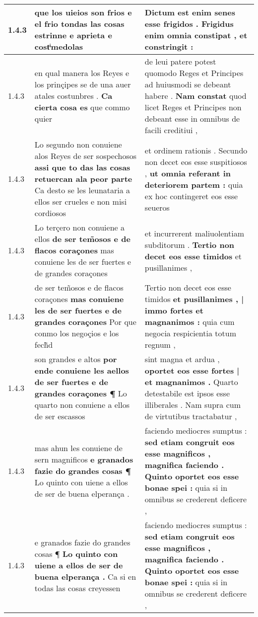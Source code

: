 \begin{tabular}{|p{1cm}|p{6.5cm}|p{6.5cm}|}
1.4.3 & que los uieios son frios \textbf{ e el frio tondas las cosas estrinne } e aprieta e costͥmedolas & Dictum est enim senes esse frigidos . \textbf{ Frigidus enim omnia constipat , } et constringit : \\\hline
1.4.3 & en qual manera los Reyes e los prinçipes se de una auer atales costunbres . \textbf{ Ca cierta cosa es } que commo quier & de leui patere potest quomodo Reges et Principes ad huiusmodi se debeant habere . \textbf{ Nam constat } quod licet Reges et Principes non debeant esse in omnibus de facili creditiui , \\\hline
1.4.3 & Lo segundo non conuiene alos Reyes de ser sospechosos \textbf{ assi que to das las cosas retuercan ala peor parte } Ca desto se les leunataria a ellos ser crueles e non misi cordiosos & et ordinem rationis . Secundo non decet eos esse suspitiosos , \textbf{ ut omnia referant in deteriorem partem : } quia ex hoc contingeret eos esse seueros \\\hline
1.4.3 & Lo terçero non conuiene a ellos \textbf{ de ser tem̃osos e de flacos coraçones } mas conuiene les de ser fuertes e de grandes coraçones & et incurrerent maliuolentiam subditorum . \textbf{ Tertio non decet eos esse timidos } et pusillanimes , \\\hline
1.4.3 & de ser tem̃osos e de flacos coraçones \textbf{ mas conuiene les de ser fuertes e de grandes coraçones } Por que conmo los negoçios e los fech̃d & Tertio non decet eos esse timidos \textbf{ et pusillanimes , | immo fortes et magnanimos : } quia cum negocia respicientia totum regnum , \\\hline
1.4.3 & son grandes e altos \textbf{ por ende conuiene les aellos de ser fuertes e de grandes coraçones ¶ } Lo quarto non conuiene a ellos de ser escassos & sint magna et ardua , \textbf{ oportet eos esse fortes | et magnanimos . } Quarto detestabile est ipsos esse illiberales . Nam supra cum de virtutibus tractabatur , \\\hline
1.4.3 & mas ahun les conuiene de sern magnificos \textbf{ e granados fazie do grandes cosas ¶ } Lo quinto con uiene a ellos de ser de buena elperança . & faciendo mediocres sumptus : \textbf{ sed etiam congruit eos esse magnificos , magnifica faciendo . Quinto oportet eos esse bonae spei : } quia si in omnibus se crederent deficere , \\\hline
1.4.3 & e granados fazie do grandes cosas ¶ \textbf{ Lo quinto con uiene a ellos de ser de buena elperança . } Ca si en todas las cosas creyessen & faciendo mediocres sumptus : \textbf{ sed etiam congruit eos esse magnificos , magnifica faciendo . Quinto oportet eos esse bonae spei : } quia si in omnibus se crederent deficere , \\\hline

\end{tabular}

